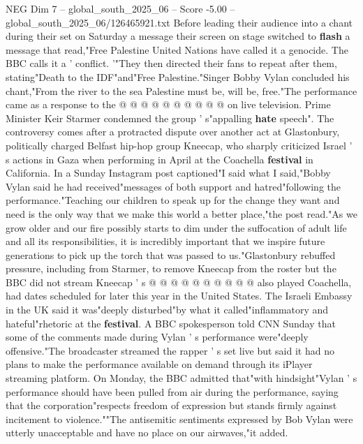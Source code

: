 \begin{textsample}{NEG Dim 7 – global\_south\_2025\_06 – Score -5.00 – global\_south\_2025\_06/126465921.txt}
Before leading their audience into a chant during their set on Saturday a message their screen on stage switched to \textbf{flash} a message that read,"Free Palestine United Nations have called it a genocide.
The BBC calls it a ' conflict. '"They then directed their fans to repeat after them, stating"Death to the IDF"and"Free Palestine."Singer Bobby Vylan concluded his chant,"From the river to the sea Palestine must be, will be, free."The performance came as a response to the @ @ @ @ @ @ @ @ @ @ on live television.
Prime Minister Keir Starmer condemned the group ' s"appalling \textbf{hate} speech".
The controversy comes after a protracted dispute over another act at Glastonbury, politically charged Belfast hip-hop group Kneecap, who sharply criticized Israel ' s actions in Gaza when performing in April at the Coachella \textbf{festival} in California.
In a Sunday Instagram post captioned"I said what I said,"Bobby Vylan said he had received"messages of both support and hatred"following the performance."Teaching our children to speak up for the change they want and need is the only way that we make this world a better place,"the post read."As we grow older and our fire possibly starts to dim under the suffocation of adult life and all its responsibilities, it is incredibly important that we inspire future generations to pick up the torch that was passed to us."Glastonbury rebuffed pressure, including from Starmer, to remove Kneecap from the roster but the BBC did not stream Kneecap ' s @ @ @ @ @ @ @ @ @ @ also played Coachella, had dates scheduled for later this year in the United States.
The Israeli Embassy in the UK said it was"deeply disturbed"by what it called"inflammatory and hateful"rhetoric at the \textbf{festival}.
A BBC spokesperson told CNN Sunday that some of the comments made during Vylan ' s performance were"deeply offensive."The broadcaster streamed the rapper ' s set live but said it had no plans to make the performance available on demand through its iPlayer streaming platform.
On Monday, the BBC admitted that"with hindsight"Vylan ' s performance should have been pulled from air during the performance, saying that the corporation"respects freedom of expression but stands firmly against incitement to violence.""The antisemitic sentiments expressed by Bob Vylan were utterly unacceptable and have no place on our airwaves,"it added.

\end{textsample}
